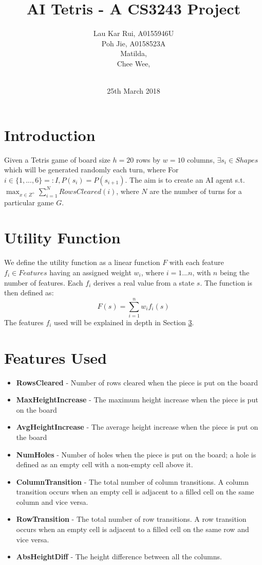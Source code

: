 \documentclass[12pt]{article}
\title{AI Tetris - A CS3243 Project}
\author
{Lau Kar Rui, A0155946U\\
Poh Jie, A0158523A\\
Matilda, \\
Chee Wee, \\
\\
}
\date{25th March 2018}
\begin{document}
 


\baselineskip20pt


\maketitle 


\section{Introduction}
Given a Tetris game of board size $h = 20$ rows by $w = 10$ columns, $ \exists s_i \in Shapes $ which will be generated randomly each turn, where 
For $i \in \{1, ..., 6\} =: I, P(s_i) = P(s_{i+1})$. The aim is to create an AI agent s.t. $ \max_{x \in Z^+} \sum^N_{i = 1} RowsCleared(i) $, where $N$ are the number of turns for a particular game $G$.
	
\section{Utility Function}
We define the utility function as a linear function $F$ with each feature $f_i \in Features$ having an assigned weight $w_i$, where $i = 1...n$, with $n$ being the number of features. Each $f_i$ derives a real value from a state $s$. The function is then defined as:
	$$F(s) = \sum_{i = 1}^{n} w_if_i(s)$$
The features $f_i$ used will be explained in depth in Section \ref{features}.
	
\section{Features Used} \label{features}
\begin{itemize}
  \item \textbf{RowsCleared}
  		- Number of rows cleared when the piece is put on the board
  \item \textbf{MaxHeightIncrease} 
  		- The maximum height increase when the piece is put on the board
  \item \textbf{AvgHeightIncrease} 
  		- The average height increase when the piece is put on the board
  \item \textbf{NumHoles} 
  		- Number of holes when the piece is put on the board; a hole is defined as an empty cell with a non-empty cell above it.
  \item \textbf{ColumnTransition}
  		- The total number of column transitions. A column transition occurs when an empty cell is adjacent to a filled cell on the same column and vice versa.
  \item \textbf{RowTransition}
  		- The total number of row transitions. A row transition occurs when an empty cell is adjacent to a filled cell on the same row and vice versa.
  \item \textbf{AbsHeightDiff}
  		- The height difference between all the columns.
\end{itemize}
\end{document}

